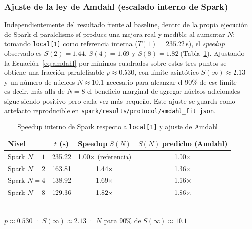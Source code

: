\subsubsection{Ajuste de la ley de Amdahl (escalado interno de Spark)}

Independientemente del resultado frente al baseline, dentro de la propia ejecución de Spark el
paralelismo sí produce una mejora real y medible al aumentar $N$: tomando \texttt{local[1]} como
referencia interna ($T(1) = 235.22$\,s), el \emph{speedup} observado es $S(2)=1.44$,
$S(4)=1.69$ y $S(8)=1.82$ (Tabla~\ref{tab:amdahl-fit}). Ajustando la Ecuación~\ref{eq:amdahl} por
mínimos cuadrados sobre estos tres puntos se obtiene una fracción paralelizable
$p \approx 0.530$, con límite asintótico $S(\infty) \approx 2.13$ y un número de núcleos
$N \approx 10.1$ necesario para alcanzar el 90\% de ese límite —es decir, más allá de $N=8$ el
beneficio marginal de agregar núcleos adicionales sigue siendo positivo pero cada vez más pequeño.
Este ajuste se guarda como artefacto reproducible en
\texttt{spark/results/protocol/amdahl\_fit.json}.

\begin{table}[H]
\centering
\caption{Speedup interno de Spark respecto a \texttt{local[1]} y ajuste de Amdahl}
\label{tab:amdahl-fit}
\begin{tabular}{@{}lccc@{}}
\toprule
\textbf{Nivel} & $\bar{t}$ (s) & \textbf{Speedup $S(N)$} & \textbf{$S(N)$ predicho (Amdahl)} \\
\midrule
Spark $N=1$ & 235.22 & 1.00$\times$ (referencia) & 1.00$\times$ \\
Spark $N=2$ & 163.81 & 1.44$\times$ & 1.36$\times$ \\
Spark $N=4$ & 138.92 & 1.69$\times$ & 1.66$\times$ \\
Spark $N=8$ & 129.36 & 1.82$\times$ & 1.86$\times$ \\
\bottomrule
\end{tabular}
\\[4pt]
\footnotesize $p \approx 0.530$ · $S(\infty) \approx 2.13$ · $N$ para 90\% de $S(\infty) \approx 10.1$
\end{table}
